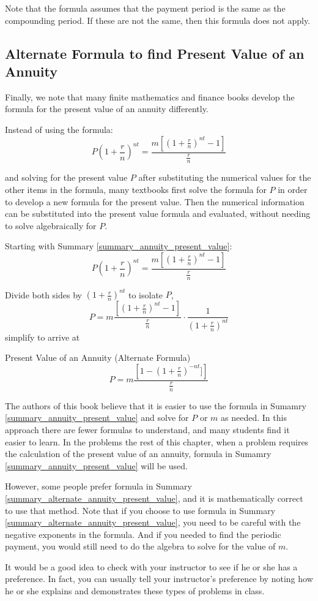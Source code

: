 Note that the formula assumes that the payment period is the same as the compounding period. If these are not the same, then this formula does not apply.

\subsection{Alternate Formula to find Present Value of an Annuity}
Finally, we note that many finite mathematics and finance books develop the formula for the present value of an annuity differently.

Instead of using the formula:
\[
    P\left(1 + \frac{r}{n}\right)^{nt} = \frac{m[(1 +\frac{r}{n})^{nt} - 1]}{\frac{r}{n}}
\]

and solving for the present value \( P \) after substituting the numerical values for the other items in the formula, many textbooks first solve the formula for \( P \) in order to develop a new formula for the present value. Then the numerical information can be substituted into the present value formula and evaluated, without needing to solve algebraically for \( P \).

Starting with Summary \ref{summary_annuity_present_value}:
\[
    P\left(1 + \frac{r}{n}\right)^{nt} = \frac{m[(1 + \frac{r}{n})^{nt} - 1]}{\frac{r}{n}}
\]

Divide both sides by \((1+\frac{r}{n})^{nt}\) to isolate \( P \),
\[
    P = m\frac{\left[(1 + \frac{r}{n})^{nt} - 1\right]}{\frac{r}{n}}\cdot\frac{1}{(1 + \frac{r}{n})^{nt}}
\]
simplify to arrive at
\begin{summarybox}{Present Value of an Annuity (Alternate Formula)}\label{summary_alternate_annuity_present_value}
    \[
        P = m\frac{\left[1- (1 + \frac{r}{n})^{-nt}]\right]}{\frac{r}{n}}
    \]
\end{summarybox}

The authors of this book believe that it is easier to use the formula in Sumamry \ref{summary_annuity_present_value} and solve for \( P \) or \( m \) as needed. In this approach there are fewer formulas to understand, and many students find it easier to learn. In the problems the rest of this chapter, when a problem requires the calculation of the present value of an annuity, formula in Sumamry \ref{summary_annuity_present_value} will be used.

However, some people prefer formula in Summary \ref{summary_alternate_annuity_present_value}, and it is mathematically correct to use that method. Note that if you choose to use formula in Summary \ref{summary_alternate_annuity_present_value}, you need to be careful with the negative exponents in the formula. And if you needed to find the periodic payment, you would still need to do the algebra to solve for the value of \( m \).

It would be a good idea to check with your instructor to see if he or she has a preference. In fact, you can usually tell your instructor’s preference by noting how he or she explains and demonstrates these types of problems in class.

